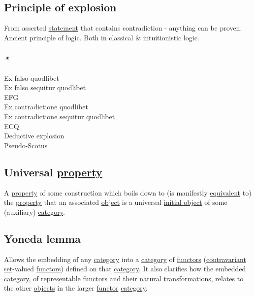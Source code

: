 \documentclass[11pt]{article}
\begin{document}
\subsection{\label{orgf3c9cf7}Principle of explosion}
\label{sec:org208ddf0}
From asserted \hyperref[org0fdd00d]{statement} that contains contradiction - anything can be proven.\\
Ancient principle of logic. Both in classical \& intuitionistic logic.\\

\subsubsection{\emph{*}}
\label{sec:orgc9217c5}

\label{org000efe7}Ex falso quodlibet\\
\label{org10c7e42}Ex falso sequitur quodlibet\\
\label{org4c5b0e2}EFG\\
\label{orge9d39e1}Ex contradictione quodlibet\\
\label{org14f9f38}Ex contradictione sequitur quodlibet\\
\label{org13cd8d6}ECQ\\
\label{org2c1d159}Deductive explosion\\
\label{orgc62724b}Pseudo-Scotus\\

\subsection{Universal \hyperref[org07ca26b]{property}}
\label{sec:orgded014a}

A \hyperref[org07ca26b]{property} of some construction which boils down to (is manifestly \hyperref[org6802c96]{equivalent} to) the \hyperref[org07ca26b]{property} that an associated \hyperref[org025aac8]{object} is a universal \hyperref[org7d94b27]{initial object} of some (auxiliary) \hyperref[org3e3a79b]{category}.\\

\subsection{Yoneda lemma}
\label{sec:orgcb25e63}

Allows the embedding of any \hyperref[org3e3a79b]{category} into a \hyperref[org3e3a79b]{category} of \hyperref[org6c3c2a6]{functors} (\hyperref[org47a73bb]{contravariant} \hyperref[orgbed80ba]{set}-valued \hyperref[org6c3c2a6]{functors}) defined on that \hyperref[org3e3a79b]{category}. It also clarifies how the embedded \hyperref[org3e3a79b]{category}, of representable \hyperref[org6c3c2a6]{functors} and their \hyperref[org740b530]{natural transformations}, relates to the other \hyperref[orge0f000f]{objects} in the larger \hyperref[org6073683]{functor} \hyperref[org3e3a79b]{category}.\\
\end{document}
